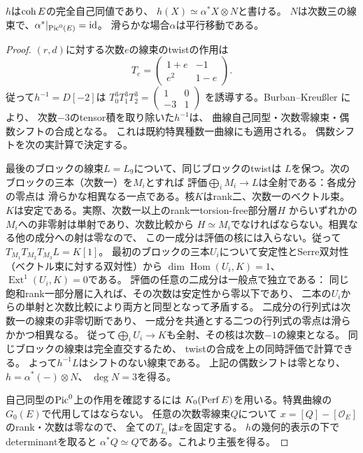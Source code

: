 \begin{lemma}\label{lem:ou-elliptic-shift}
$h$は$\operatorname{coh} E$の完全自己同値であり、
$h(X)\simeq \alpha^*X\otimes N$と書ける。
$N$は次数三の線束で、$\alpha^*|_{\operatorname{Pic}^0(E)}=\mathrm{id}$。
滑らかな場合$\alpha$は平行移動である。
\end{lemma}
\begin{proof}
$(r,d)$に対する次数$e$の線束のtwistの作用は
\[
 T_e=\begin{pmatrix}1+e&-1\\e^2&1-e\end{pmatrix}.
\]
従って$h^{-1}=D[-2]$は
$T_0^3T_1^3T_2^3=\left(\begin{smallmatrix}1&0\\-3&1\end{smallmatrix}\right)$
を誘導する。Burban--Kreu{\ss}ler
\cite[Corollary~5.8]{BurbanKreu2006}により、
次数$-3$のtensor積を取り除いた$h^{-1}$は、
曲線自己同型・次数零線束・偶数シフトの合成となる。
これは既約特異種数一曲線にも適用される。
偶数シフトを次の実計算で決定する。

最後のブロックの線束$L=L_9$について、同じブロックのtwistは
$L$を保つ。次のブロックの三本（次数一）を$M_i$とすれば
評価$\bigoplus_i M_i\to L$は全射である：各成分の零点は
滑らかな相異なる一点である。核$K$はrank二、次数一のベクトル束。
$K$は安定である。実際、次数一以上のrank一torsion-free部分層$H$
からいずれかの$M_i$への非零射は単射であり、次数比較から
$H\simeq M_i$でなければならない。相異なる他の成分への射は零なので、
この一成分は評価の核には入らない。従って
$T_{M_1}T_{M_2}T_{M_3}L=K[1]$。
最初のブロックの三本$U_i$について安定性とSerre双対性
（ベクトル束に対する双対性）から
$\dim\operatorname{Hom}(U_i,K)=1$、
$\operatorname{Ext}^1(U_i,K)=0$である。
評価の任意の二成分は一般点で独立である：
同じ飽和rank一部分層に入れば、その次数は安定性から零以下であり、
二本の$U_i$からの単射と次数比較により両方と同型となって矛盾する。
二成分の行列式は次数一の線束の非零切断であり、
一成分を共通とする二つの行列式の零点は滑らかかつ相異なる。
従って$\bigoplus_iU_i\to K$も全射、その核は次数$-1$の線束となる。
同じブロックの線束は完全直交するため、
twistの合成を上の同時評価で計算できる。
よって$h^{-1}L$はシフトのない線束である。
上記の偶数シフトは零となり、$h=\alpha^*(-)\otimes N$、
$\deg N=3$を得る。

自己同型の$\operatorname{Pic}^0$上の作用を確認するには
$K_0(\operatorname{Perf} E)$を用いる。特異曲線の$G_0(E)$で代用してはならない。
任意の次数零線束$Q$について
$x=[Q]-[\mathcal O_E]$のrank・次数は零なので、
全ての$T_{L_i}$は$x$を固定する。
$h$の幾何的表示の下でdeterminantを取ると
$\alpha^*Q\simeq Q$である。これより主張を得る。
\end{proof}


